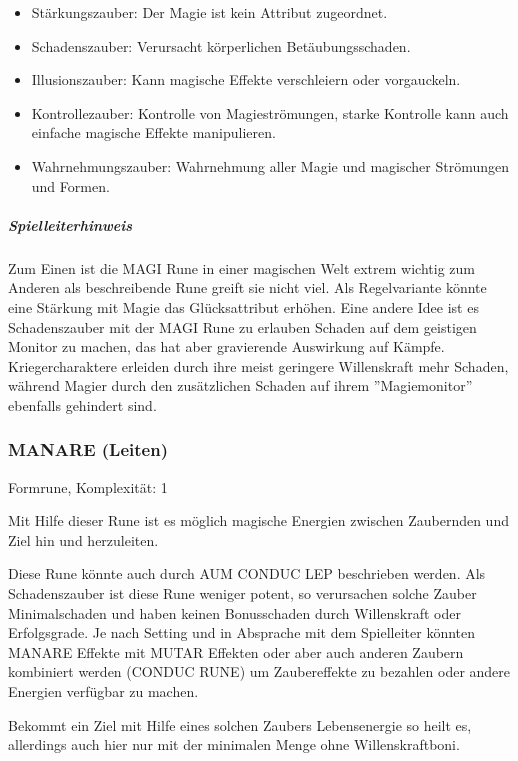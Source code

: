 \documentclass{article}
\begin{document}
\begin{itemize}
\item Stärkungszauber: Der Magie ist kein Attribut zugeordnet.
\item Schadenszauber: Verursacht körperlichen Betäubungsschaden.
\item Illusionszauber: Kann magische Effekte verschleiern oder vorgauckeln.
\item Kontrollezauber: Kontrolle von Magieströmungen, starke Kontrolle kann auch einfache magische Effekte manipulieren.
\item Wahrnehmungszauber: Wahrnehmung aller Magie und magischer Strömungen und Formen.
\end{itemize}

\begin{mdframed}[hidealllines=true, backgroundcolor=black!10]
\subparagraph{Spielleiterhinweis}

Zum Einen ist die MAGI Rune in einer magischen Welt extrem wichtig zum Anderen als beschreibende Rune greift sie
nicht viel. Als Regelvariante könnte eine Stärkung mit Magie das Glücksattribut erhöhen. Eine andere Idee ist es
Schadenszauber mit der MAGI Rune zu erlauben Schaden auf dem geistigen Monitor zu machen, das hat aber gravierende
Auswirkung auf Kämpfe. Kriegercharaktere erleiden durch ihre meist geringere Willenskraft mehr Schaden, während
Magier durch den zusätzlichen Schaden auf ihrem ''Magiemonitor'' ebenfalls gehindert sind.

\end{mdframed}
\subsubsection{MANARE (Leiten)}

Formrune, Komplexität: 1

Mit Hilfe dieser Rune ist es möglich magische Energien zwischen Zaubernden und Ziel hin und herzuleiten.

Diese Rune könnte auch durch AUM CONDUC LEP beschrieben werden. Als Schadenszauber ist diese Rune weniger potent,
so verursachen solche Zauber Minimalschaden und haben keinen Bonusschaden durch Willenskraft oder Erfolgsgrade. Je
nach Setting und in Absprache mit dem Spielleiter könnten MANARE Effekte mit MUTAR Effekten oder aber auch anderen
Zaubern kombiniert werden (CONDUC RUNE) um Zaubereffekte zu bezahlen oder andere Energien verfügbar zu machen.

Bekommt ein Ziel mit Hilfe eines solchen Zaubers Lebensenergie so heilt es, allerdings auch hier nur mit der
minimalen Menge ohne Willenskraftboni.
\end{document}
